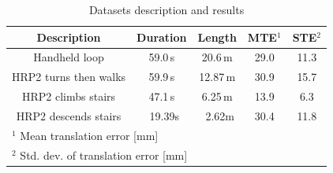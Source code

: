 %
\begin{table}[t]
    \centering
    \caption{Datasets description and results}
    \begin{tabular}{c|c|c|c|c}
        Description & Duration & Length & MTE$^1$ & STE$^2$ \\
        \hline
        \hline
        Handheld loop & 59.0\,\textrm{s} & 20.6\,\textrm{m} & 29.0 & 11.3  \\
        \hline
        HRP2 turns then walks & 59.9\,\textrm{s} & 12.87\,\textrm{m} & 30.9 & 15.7 \\
        \hline
        HRP2 climbs stairs & 47.1\,\textrm{s} & 6.25\,\textrm{m} & 13.9 & 6.3 \\
        \hline
        HRP2 descends stairs & \, 19.39\textrm{s} & \, 2.62\textrm{m} & 30.4 & 11.8 \\
        \hline
        \multicolumn{5}{l}{$^1$ Mean translation error [mm]} \\
        \multicolumn{5}{l}{$^2$ Std. dev. of translation error [mm]} 
    \end{tabular}
    \label{tab:datasets}
\end{table}


